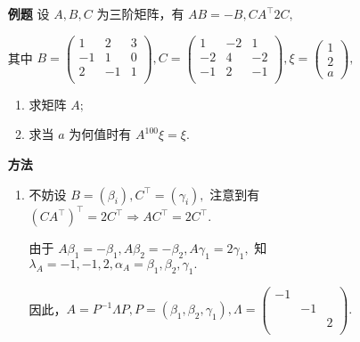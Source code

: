 \begin{itemize}
    \item[\textbf{例题}] 设 $ A,B,C $ 为三阶矩阵，有 $ AB = -B, CA^\top 2C, $ 
    
    其中 $ B = \begin{pmatrix}
        1&2&3\\-1&1&0\\2&-1&1\\
    \end{pmatrix},C = \begin{pmatrix}
        1&-2&1\\-2&4&-2\\-1&2&-1\\
    \end{pmatrix},\xi = \begin{pmatrix}
        1\\2\\a
    \end{pmatrix}, $ 
    \begin{enumerate}[label = \Roman*.]
        \item 求矩阵 $ A; $ 
        \item 求当 $ a $ 为何值时有 $ A^{100}\xi = \xi. $ 
    \end{enumerate}
    \item[\textbf{方法}] \begin{enumerate}[label = \Roman*.]
        \item 不妨设 $ B = (\beta_i),C^\top = (\gamma_i), $ 注意到有 $ (CA^\top)^\top = 2C^\top\Rightarrow
        AC^\top = 2C^\top. $ 
        
        由于 $ A\beta_1 = -\beta_1,A\beta_2 = -\beta_2, A\gamma_1 = 2\gamma_1, $ 
        知 $ \lambda_A = -1,-1,2,\alpha_A = \beta_1,\beta_2,\gamma_1. $ 
        
        因此，$ A = P^{-1}\Lambda P, P = (\beta_1,\beta_2,\gamma_1), \Lambda = 
        \begin{pmatrix}
            -1&&\\&-1&\\&&2\\
        \end{pmatrix}. $ 


\end{enumerate}
\end{itemize}
